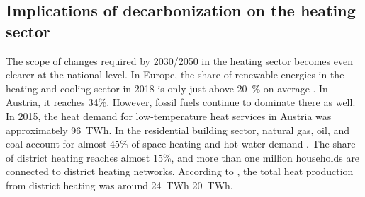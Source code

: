 \subsection{Implications of decarbonization on the heating sector}
The scope of changes required by 2030/2050 in the heating sector becomes even clearer at the national level. In Europe, the share of renewable energies in the heating and cooling sector in 2018 is only just above \SI{20}{\%} on average \cite{eurostat_reference}. In Austria, it reaches 34\%. However, fossil fuels continue to dominate there as well. In 2015, the heat demand for low-temperature heat services in Austria was approximately \SI{96}{TWh}.  In the residential building sector, natural gas, oil, and coal account for almost 45\% of space heating and hot water demand  \cite{oesterreichsenergie}. The share of district heating reaches almost 15\%, and more than one million households are connected to district heating networks. According to \cite{statisitik2016}, the total heat production from district heating was around \SI{24}{TWh}  \SI{20}{TWh}. 

